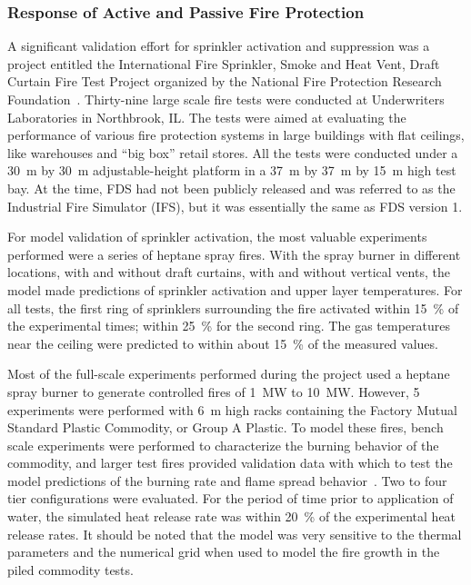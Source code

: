 \subsubsection{Response of Active and Passive Fire Protection}

A   significant  validation  effort   for  sprinkler   activation  and suppression was  a project entitled the  International Fire Sprinkler, Smoke
and Heat Vent, Draft  Curtain Fire Test Project organized by the National   Fire  Protection   Research  Foundation~\cite{McGrattan:5}. Thirty-nine
large scale  fire  tests were  conducted at  Underwriters Laboratories in  Northbrook, IL.  The  tests were aimed  at evaluating the performance of
various  fire protection systems in large buildings with  flat ceilings, like  warehouses and  ``big box''  retail stores. All the  tests were
conducted  under a 30~m by  30~m adjustable-height platform in a 37~m by 37~m by 15~m high test bay. At the time, FDS had not been publicly released
and  was referred to as the Industrial Fire Simulator (IFS), but it was essentially the same as FDS version 1.

For  model  validation  of  sprinkler activation,  the  most  valuable experiments performed were a series  of heptane spray fires.  With the spray
burner in different  locations, with and without draft curtains, with  and  without  vertical  vents,  the model  made  predictions  of sprinkler
activation and upper layer temperatures.  For all tests, the first ring  of sprinklers surrounding the fire  activated within 15~\% of the
experimental  times; within 25~\% for the  second ring. The gas temperatures near the ceiling were  predicted to within about 15~\% of the measured
values.

Most of the full-scale experiments performed during the project used a heptane  spray  burner  to   generate  controlled  fires  of  1~MW  to 10~MW.
However, 5  experiments  were performed  with  6~m high  racks containing the  Factory Mutual Standard Plastic Commodity,  or Group A Plastic. To
model these  fires, bench scale experiments were performed to characterize the burning behavior of the commodity, and larger test fires  provided
validation  data  with  which  to   test  the  model predictions    of    the     burning    rate    and    flame    spread
behavior~\cite{Hamins:1,Hamins:IAFSS2002}.     Two   to    four   tier configurations  were  evaluated.  For  the  period  of  time prior  to
application of water, the simulated heat release rate was within 20~\% of the experimental  heat release rates.  It should  be noted that the model
was very  sensitive to the thermal parameters  and the numerical grid when used to model the fire growth in the piled commodity tests.


